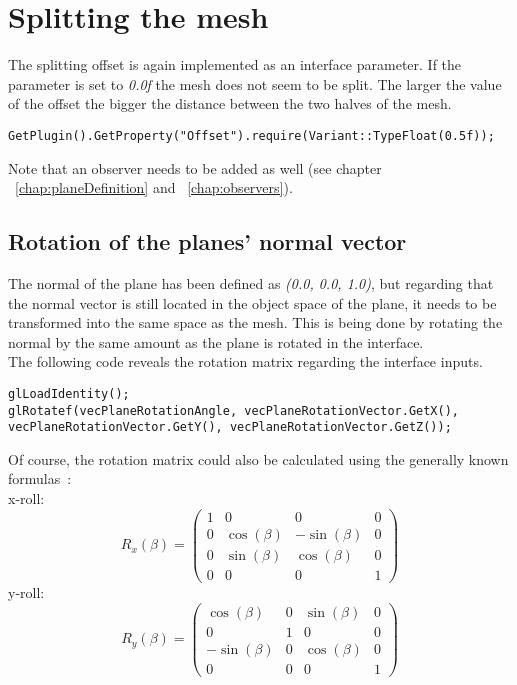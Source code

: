 \section{Splitting the mesh}

The splitting offset is again implemented as an interface parameter. If the parameter is set to \emph{0.0f} the mesh does not seem to be split. The larger the value of the offset the bigger the distance between the two halves of the mesh.
\begin{lstlisting}
GetPlugin().GetProperty("Offset").require(Variant::TypeFloat(0.5f));
\end{lstlisting}

Note that an observer needs to be added as well (see chapter ~\ref{chap:planeDefinition} and ~\ref{chap:observers}).

\subsection{Rotation of the planes' normal vector}
The normal of the plane has been defined as \emph{(0.0, 0.0, 1.0)}, but regarding that the normal vector is still located in the object space of the plane, it needs to be transformed into the same space as the mesh. This is being done by rotating the normal by the same amount as the plane is rotated in the interface.\\
The following code reveals the rotation matrix regarding the interface inputs.
\begin{lstlisting}
glLoadIdentity();
glRotatef(vecPlaneRotationAngle, vecPlaneRotationVector.GetX(), vecPlaneRotationVector.GetY(), vecPlaneRotationVector.GetZ());
\end{lstlisting}
Of course, the rotation matrix could also be calculated using the generally known formulas~\cite{book:computerGraphicsHill}:\\ %
\newline
x-roll:
\begin{equation}
R_{x}(\beta) = 
\begin{pmatrix} 
	1 & 0 & 0 & 0 \\ 
	0 & \cos(\beta) & -\sin(\beta) & 0 \\ 
	0 & \sin(\beta) & \cos(\beta) & 0 \\ 
	0 & 0 & 0 & 1 
\end{pmatrix}
\end{equation}
\newline
y-roll:\\
\begin{equation}
R_{y}(\beta) =
\begin{pmatrix} 
	\cos(\beta) & 0 & \sin(\beta) & 0 \\
	0 & 1 & 0 & 0 \\
	-\sin(\beta) & 0 & \cos(\beta) & 0 \\
	0 & 0 & 0 & 1
\end{pmatrix}
\end{equation}
